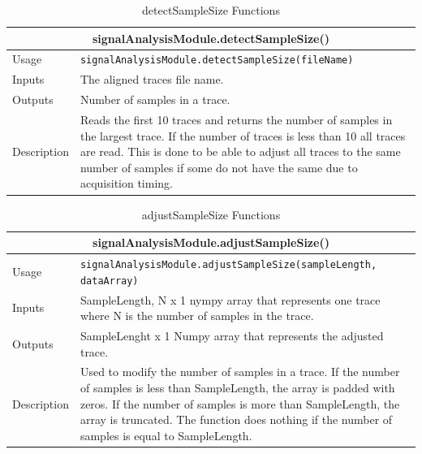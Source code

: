 \documentclass{llncs}
\numberwithin{algorithm}{chapter}
\begin{document}
\begin{table}
\caption{detectSampleSize Functions}
\begin{tabular}{ |p{2cm}||p{11cm}|  }
 \hline
 \multicolumn{2}{|c|}{\cellcolor{teal}\textbf{signalAnalysisModule.detectSampleSize()}} \\
 \hline
 Usage & \texttt{signalAnalysisModule.detectSampleSize(fileName)}\\ \hline
 Inputs & The aligned traces file name. \\ \hline
 Outputs & Number of samples in a trace. \\ \hline
 Description & Reads the first 10 traces and returns the number of samples in the largest trace.
If the number of traces is less than 10 all traces are read.
This is done to be able to adjust all traces to the same number of samples if some do not have the same due to acquisition timing. \\ \hline
\end{tabular}
\end{table}

\begin{table}
\caption{adjustSampleSize Functions}
\begin{tabular}{ |p{2cm}||p{11cm}|  }
 \hline
 \multicolumn{2}{|c|}{\cellcolor{teal}\textbf{signalAnalysisModule.adjustSampleSize()}} \\
 \hline
 Usage & \texttt{signalAnalysisModule.adjustSampleSize(sampleLength, dataArray)}\\ \hline
 Inputs & SampleLength, 
N x 1 nympy array that represents one trace where N is the number of samples in the trace. \\ \hline
 Outputs & SampleLenght x 1 Numpy array that represents the adjusted trace. \\ \hline
 Description & Used to modify the number of samples in a trace. If the number of samples is less than SampleLength, the array is padded with zeros. If the number of samples is more than SampleLength, the array is truncated. The function does nothing if the number of samples is equal to SampleLength.
 \\ \hline
\end{tabular}
\end{table}
\end{document}
